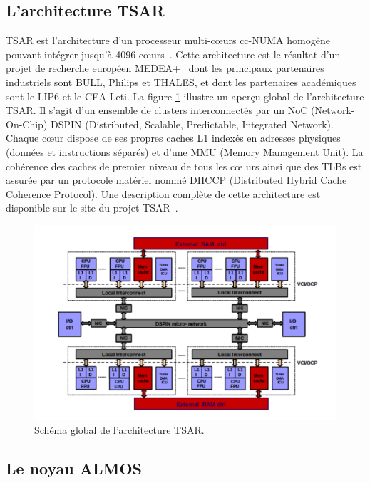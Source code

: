   \subsection{L'architecture TSAR}
  \label{sec:tsar}

    TSAR est l'architecture d’un processeur multi-c\oe urs cc-NUMA homogène
    pouvant intégrer jusqu’à 4096 c\oe urs~\cite{greiner2009tsar}. Cette
    architecture est le résultat d’un projet de recherche européen
    MEDEA+~\cite{tsar2008} dont les principaux partenaires industriels sont
    BULL, Philips et THALES, et dont les partenaires académiques sont le LIP6 et
    le CEA-Leti. La figure \ref{fig:tsar} illustre un aperçu global de
    l'architecture TSAR. Il s'agit d'un ensemble de clusters interconnectés par
    un NoC (Network-On-Chip) DSPIN (Distributed, Scalable, Predictable,
    Integrated Network). Chaque c\oe ur dispose de ses propres caches L1 indexés
    en adresses physiques (données et instructions séparés) et d'une MMU (Memory
    Management Unit). La cohérence des caches de premier niveau de tous les c\oe
    urs ainsi que des TLBs est assurée par un protocole matériel nommé DHCCP
    (Distributed Hybrid Cache Coherence Protocol). Une description complète de
    cette architecture est disponible sur le site du projet
    TSAR~\cite{tsar2008web}.

    \begin{figure}[!h]
      \centering \includegraphics[scale=0.16]{include/img/tsar.png}
      \caption{Schéma global de l'architecture TSAR.~\cite{greiner2009tsar}}
      \label{fig:tsar}
    \end{figure}
  
  \subsection{Le noyau ALMOS}
  \label{sec:almos}

